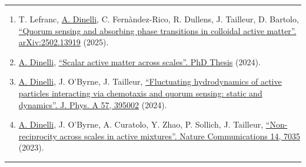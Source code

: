 \documentclass{scrartcl}
\begin{document}
\begin{cv}{}
\vspace{1em}

\par\noindent\rule{\textwidth}{0.4pt}

\vspace{1.5em}


\newpage


\noindent{}\vspace{1em}
\small
\begin{enumerate}
\item T. Lefranc, \underline{A. Dinelli}, C. Fernàndez-Rico, R. Dullens, J. Tailleur, D. Bartolo, \href{https://arxiv.org/abs/2502.13919}{``Quorum sensing and absorbing phase transitions in colloidal active matter''. arXiv:2502.13919} (2025).
\item \underline{A. Dinelli}, \href{https://theses.hal.science/tel-04708958}{``Scalar active matter across scales''. PhD Thesis} (2024).
\item \underline{A. Dinelli}, J. O’Byrne, J. Tailleur, \href{https://iopscience.iop.org/article/10.1088/1751-8121/ad72bc}{``Fluctuating hydrodynamics of active particles interacting via chemotaxis and quorum sensing: static and dynamics''. J. Phys. A 57, 395002} (2024).
\item \underline{A. Dinelli}, J. O’Byrne, A. Curatolo, Y. Zhao, P. Sollich, J. Tailleur, \href{https://doi.org/10.1038/s41467-023-42713-5}{``Non-reciprocity across scales in active mixtures''. Nature Communications 14, 7035} (2023). 
\end{enumerate}
  

\par\noindent\rule{\textwidth}{0.4pt}

\vspace{1.5em}







\noindent{}\vspace{1em}

\def\v{-0.1cm}


\end{cv}
\end{document}
